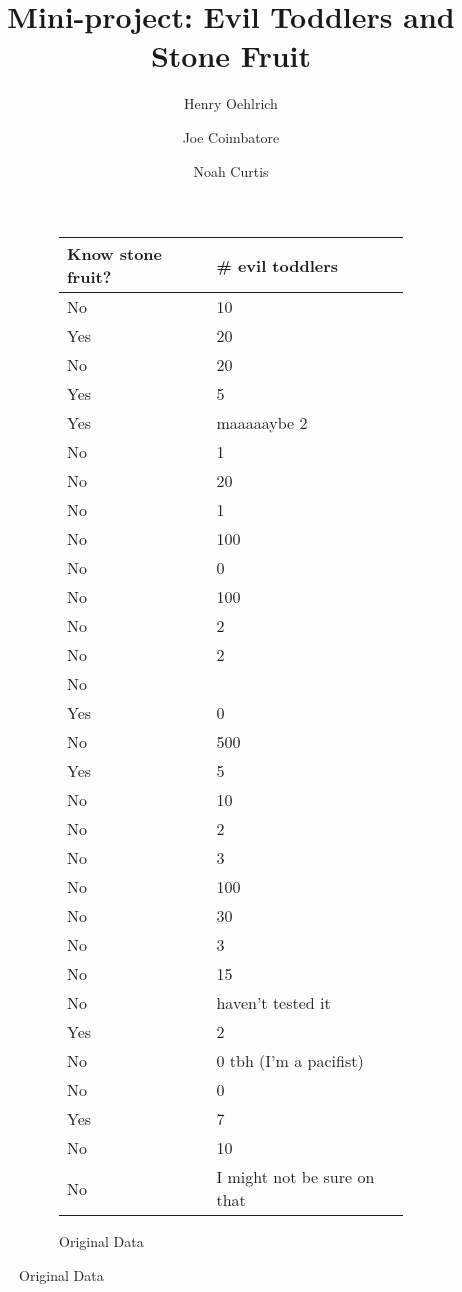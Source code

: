\documentclass{article}
\title{Mini-project: Evil Toddlers and Stone Fruit}
\author{Henry Oehlrich \and Joe Coimbatore \and Noah Curtis}
\begin{document}
\maketitle
\begin{figure}
    \centering
    \caption{Data}
    \label{fig:data}
    \begin{subfigure}{.5\textwidth}
        \centering
        \label{fig:original}
        \caption{Original Data}
        \begin{tabular}{p{3cm}|p{3cm}}
            \toprule
            Know stone fruit? & \# evil toddlers \\
            \midrule
            No & 10 \\
            Yes & 20 \\
            No & 20 \\
            Yes & 5 \\
            Yes & maaaaaybe 2 \\
            No & 1 \\
            No & 20 \\
            No & 1 \\
            No & 100 \\
            No & 0 \\
            No & 100 \\
            No & 2 \\
            No & 2 \\
            No \\
            Yes & 0 \\
            No & 500 \\
            Yes & 5 \\
            No & 10 \\
            No & 2 \\
            No & 3 \\
            No & 100 \\
            No & 30 \\
            No & 3 \\
            No & 15 \\
            No & haven't tested it \\
            Yes & 2 \\
            No & 0 tbh (I'm a pacifist) \\
            No & 0 \\
            Yes & 7 \\
            No & 10 \\
            No & I might not be sure on that \\

\end{tabular}
\end{subfigure}
\end{figure}
\end{document}
